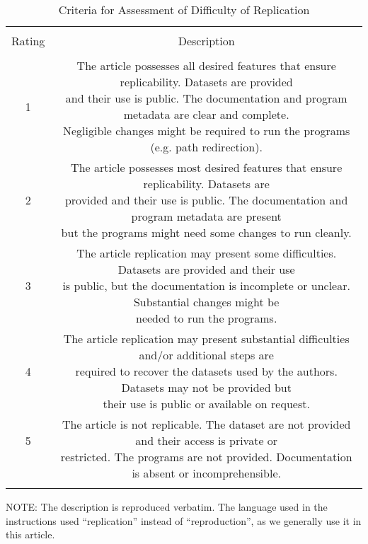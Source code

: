 \begin{table}[!htbp] \centering
  \caption{Criteria for Assessment of Difficulty of Replication}
  \label{tab:criteria_difficulty}
\footnotesize
\begin{tabular}{@{\extracolsep{3pt}} cc}
\\[-1.8ex]\hline
\hline \\[-1.8ex]
Rating & Description   \\
\hline \\[-1.8ex]
\thead[bc]{~\\1\\~} & \thead{The article possesses all desired features that ensure replicability. Datasets are provided\\
and their use is public. The documentation and program metadata are clear and complete.\\ Negligible changes might be required to run the programs (e.g. path redirection).}\\
\thead[bc]{~\\2\\~} &  \thead{The article possesses most desired features that ensure replicability. Datasets are \\ provided and their use is public. The documentation and program metadata are present\\ but the programs might need some changes to run cleanly.} \\
\thead[bc]{~\\3\\~}  & \thead{The article replication may present some difficulties. Datasets are provided and their use\\ is public, but the documentation is incomplete or unclear. Substantial changes might be\\ needed to run the programs.}  \\
\thead[bc]{~\\4\\~} & \thead{The article replication may present substantial difficulties and/or additional steps are\\ required to recover the datasets used by the authors. Datasets may not be provided but\\ their use is public or available on request.}\\
\thead[bc]{5\\~} & \thead{The article is not replicable. The dataset are not provided and their access is private or\\ restricted. The programs are not provided. Documentation is absent or incomprehensible.}   \\
\hline \\[-1.8ex]
\end{tabular}
\begin{minipage}{0.8\textwidth}
NOTE: The description is reproduced verbatim. The language used in the instructions used ``replication'' instead of ``reproduction'', as we generally use it in this article.

\end{minipage}
\end{table}


